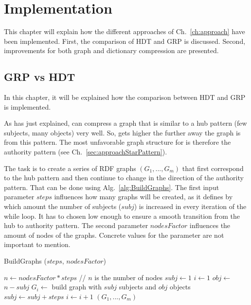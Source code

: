 \chapter{Implementation}\label{ch:implementation}

This chapter will explain how the different approaches of Ch.~\ref{ch:approach} have been implemented. First, the comparison of HDT and GRP is discussed. Second, improvements for both graph and dictionary compression are presented.

\section{GRP vs HDT}\label{sec:implementationGRPvsHDT}

In this chapter, it will be explained how the comparison between HDT and GRP is implemented.

As has just explained, \GHDT{} can compress a graph that is similar to a hub pattern (few subjects, many objects) very well. So,  gets higher the further away the graph is from this pattern. The most unfavorable graph structure for \GHDT{} is therefore the authority pattern (see Ch.~\ref{sec:approachStarPattern}).

The task is to create a series of RDF graphs $(G_1,...,G_m)$ that first correspond to the hub pattern and then continue to change in the direction of the authority pattern. That can be done using Alg.~\ref{alg:BuildGraphs}. The first input parameter $steps$ influences how many graphs will be created, as it defines by which amount the number of subjects ($subj$) is increased in every iteration of the while loop. It has to chosen low enough to ensure a smooth transition from the hub to authority pattern. The second parameter $nodesFactor$ influences the amount of nodes of the graphs. Concrete values for the parameter are not important to mention.

\begin{algorithm}
	\caption{BuildGraphs ($steps$, $ nodesFactor$)}\label{alg:BuildGraphs}
	\begin{algorithmic}[1]
		\State $n \leftarrow nodesFactor*steps$ // $n$ is the number of nodes
		\State $subj \leftarrow 1$
		\State $i \leftarrow 1$
		\State $obj \leftarrow$ $n-subj$ 
		\State $G_i \leftarrow$ build graph with $subj$ subjects and $obj$ objects\label{line:buildgraph}
		\State  $subj\leftarrow subj+steps$
		\State  $i\leftarrow i+1$
		\EndWhile
		\State \Return $(G_1,...,G_m)$
	\end{algorithmic}
\end{algorithm}

